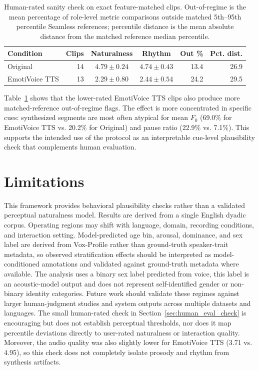 \documentclass[conference]{IEEEtran}
\begin{document}
\begin{table}[t]
\centering
\caption{Human-rated sanity check on exact feature-matched clips. Out-of-regime is the mean percentage of role-level metric comparisons outside matched 5th--95th percentile Seamless references; percentile distance is the mean absolute distance from the matched reference median percentile.}
\label{tab:human_eval_reference_check}
\small
\setlength{\tabcolsep}{3pt}
\begin{tabular}{l r c c r r}
\toprule
\textbf{Condition} & \textbf{Clips} & \textbf{Naturalness} & \textbf{Rhythm} & \textbf{Out \%} & \textbf{Pct. dist.} \\
\midrule
Original & 14 & $4.79 \pm 0.24$ & $4.74 \pm 0.43$ & 13.4 & 26.9 \\
EmotiVoice TTS & 13 & $2.29 \pm 0.80$ & $2.44 \pm 0.54$ & 24.2 & 29.5 \\
\bottomrule
\end{tabular}
\end{table}

Table~\ref{tab:human_eval_reference_check} shows that the lower-rated EmotiVoice TTS clips also produce more matched-reference out-of-regime flags. 
The effect is more concentrated in specific cues: synthesized segments are most often atypical for mean $F_0$ (69.0\% for EmotiVoice TTS vs. 20.2\% for Original) and pause ratio (22.9\% vs. 7.1\%). 
This supports the intended use of the protocol as an interpretable cue-level plausibility check that complements human evaluation.

\section{Limitations}\label{sec:limitations}
This framework provides behavioral plausibility checks rather than a validated perceptual naturalness model. 
Results are derived from a single English dyadic corpus. 
Operating regions may shift with language, domain, recording conditions, and interaction setting. 
Model-predicted age bin, arousal, dominance, and sex label are derived from Vox-Profile rather than ground-truth speaker-trait metadata, so observed stratification effects should be interpreted as model-conditioned annotations and validated against ground-truth metadata where available.
The analysis uses a binary sex label predicted from voice, this label is an acoustic-model output and does not represent self-identified gender or non-binary identity categories.
Future work should validate these regimes against larger human-judgment studies and system outputs across multiple datasets and languages.
The small human-rated check in Section~\ref{sec:human_eval_check} is encouraging but does not establish perceptual thresholds, nor does it map percentile deviations directly to user-rated naturalness or interaction quality. 
Moreover, the audio quality was also slightly lower for EmotiVoice TTS (3.71 vs. 4.95), so this check does not completely isolate prosody and rhythm from synthesis artifacts. 
\end{document}
